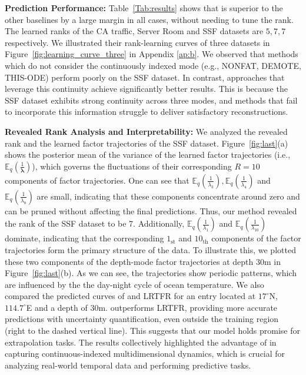\textbf{Prediction Performance: }
Table~\ref{Tab:results} shows that \MODEL  is superior to the other baselines by a large margin in all cases,  without  needing to tune the   rank. The learned ranks of the CA traffic,  Server Room and SSF datasets are $5,  7,  7$ respectively. 
We illustrated  their rank-learning curves  of three datasets in Figure~\ref{fig:learning_curve_three} in  Appendix \ref{ap:b}.
We observed that methods which do not consider the continuously indexed mode (e.g.,  NONFAT,  DEMOTE,  THIS-ODE) perform poorly on the SSF dataset. In contrast,  approaches that leverage this continuity achieve significantly better results. This is because the SSF dataset exhibits strong continuity across three modes,  and methods that fail to incorporate this information struggle to deliver satisfactory reconstructions.



\textbf{Revealed Rank Analysis and Interpretability:}
We analyzed the revealed rank and  the learned factor  trajectories of the SSF dataset. 
  Figure~\ref{fig:last}(a) shows the posterior mean of  the variance of the learned  factor trajectories (i.e.,  $\mathbb{E}_{q}(\frac{1}{\boldsymbol{\lambda}})$),  which governs the fluctuations of their corresponding $R=10$ components of factor  trajectories.
One can see that  $\mathbb{E}_q(\frac{1}{\lambda_3}), \mathbb{E}_q(\frac{1}{\lambda_{4}})$ and $\mathbb{E}_q(\frac{1}{\lambda_{8}})$ are small, indicating that these components concentrate around zero and  can be pruned without affecting the final predictions. Thus,  our method revealed the rank of the SSF dataset to be  7.
Additionally,   
$\mathbb{E}_q(\frac{1}{\lambda_1})$ and $\mathbb{E}_q(\frac{1}{\lambda_{10}})$  dominate,  indicating that the corresponding $1_{\text{st}}$ and $10_{\text{th}}$ components of the  factor trajectories form the primary structure of the data. 
To illustrate this,  we plotted these two components of the depth-mode factor trajectories  at depth 30m in Figure~\ref{fig:last}(b).
 As we can see,  the trajectories show periodic patterns,  which are  influenced by the the day-night cycle of ocean temperature.
We also compared the predicted curves of \MODEL and LRTFR for an entry  
 located at  $17^{\circ}$N,  $114.7^{\circ}$E and a depth of 30m.  \MODEL outperforms LRTFR,  providing more accurate predictions with uncertainty quantification,  even outside the training region (right to the dashed vertical line).
  This suggests that our model holds promise for extrapolation tasks.
The results collectively highlighted the advantage of \MODEL  in capturing continuous-indexed multidimensional dynamics,  which is crucial for analyzing real-world temporal data and performing predictive tasks.



